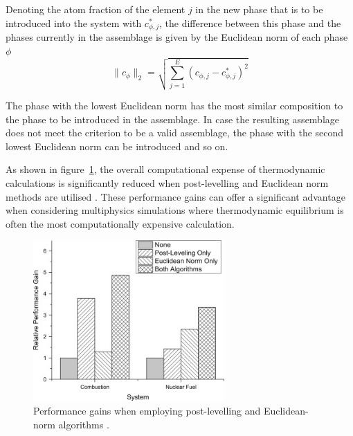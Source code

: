 	Denoting the atom fraction of the element $j$ in the new phase that is to be introduced into the system with $c_{\phi,j}^{*}$, the difference between this phase and the phases currently in the assemblage is given by the Euclidean norm of each phase $\phi$
	\begin{equation}
		\|c_\phi\|_2 = \sqrt{\sum_{j=1}^{E} \left(c_{\phi,j} - c_{\phi,j}^{*}\right)^2}
	\end{equation}
	
	The phase with the lowest Euclidean norm has the most similar composition to the phase to be introduced in the assemblage. In case the resulting assemblage does not meet the criterion to be a valid assemblage, the phase with the second lowest Euclidean norm can be introduced and so on. 
	
	As shown in figure~\ref{fig:PEA_gains}, the overall computational expense of thermodynamic calculations is significantly reduced when post-levelling and Euclidean norm methods are utilised \cite{Piro12a}. These performance gains can offer a significant advantage when considering multiphysics simulations where thermodynamic equilibrium is often the most computationally expensive calculation. 
	
	\begin{figure}[htbp]
		\centering
		\includegraphics[width=0.65\textwidth]{figures/PEA_Gains}
		\caption{Performance gains when employing post-levelling and Euclidean-norm algorithms \cite{Piro12a}.}
		\label{fig:PEA_gains}
	\end{figure}

	
